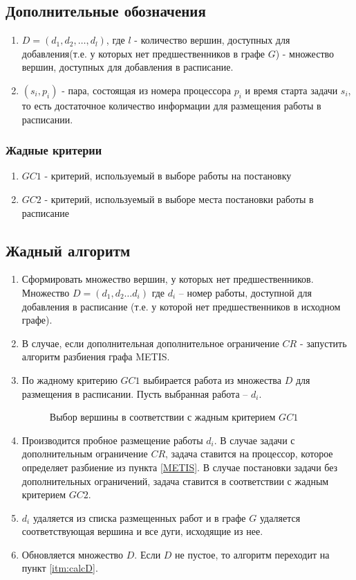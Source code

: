 \subsection{Дополнительные обозначения}
\begin{enumerate}
    \item $D= \left( d_1, d_2, \dots, d_l \right)$, где $l$ - количество вершин, доступных для добавления(т.е. у которых нет предшественников в графе $G$) - множество вершин, доступных для добавления в расписание.
    \item $\left( s_i, p_i \right)$ - пара, состоящая из номера процессора $p_i$ и время старта задачи $s_i$, то есть достаточное количество информации для размещения работы в расписании.
\end{enumerate}
\subsubsection{Жадные критерии}
\begin{enumerate}
    \item $GC1$ - критерий, используемый в выборе работы на постановку
    \item $GC2$ - критерий, используемый в выборе места постановки работы в расписание
\end{enumerate}

\subsection{Жадный алгоритм}
\begin{enumerate}
    \item Сформировать множество вершин, у которых нет предшественников. Множество $D = \left( d_1, d_2 \dots d_i \right)$ где $d_i$ – номер работы, доступной для добавления в расписание (т.е. у которой нет предшественников в исходном графе).
    \item \label{METIS} В случае, если дополнительная дополнительное ограничение $CR$ - запустить алгоритм разбиения графа METIS.
    \item \label{itm:calcD} По жадному критерию $GC1$ выбирается работа из множества $D$ для размещения в расписании. Пусть выбранная работа – $d_i$.
          \begin{figure}[H]
              \caption{Выбор вершины в соответствии с жадным критерием $GC1$}
          \end{figure}
    \item Производится пробное размещение работы $d_i$. В случае задачи с дополнительным ограничение $CR$, задача ставится на процессор, которое определяет разбиение из пункта \ref{METIS}. В случае постановки задачи без дополнительных ограничений, задача ставится в соответствии с жадным критерием $GC2$.
    \item $d_i$ удаляется из списка размещенных работ и в графе $G$ удаляется соответствующая вершина и все дуги, исходящие из нее.
    \item Обновляется множество $D$. Если $D$ не пустое, то алгоритм переходит на пункт \ref{itm:calcD}.
\end{enumerate}
